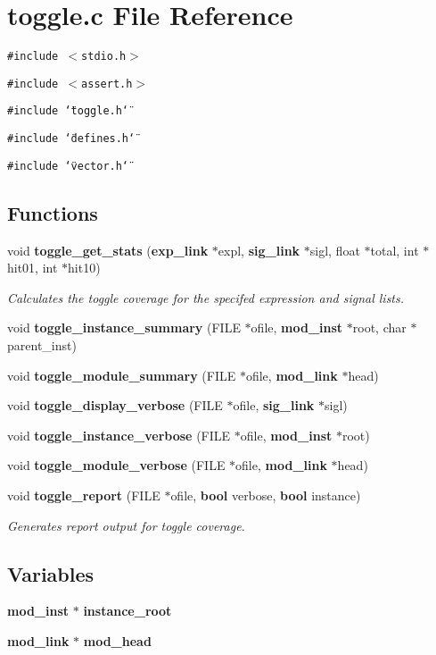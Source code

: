 \section{toggle.c File Reference}
\label{toggle_8c}
{\tt \#include $<$stdio.h$>$}\par
{\tt \#include $<$assert.h$>$}\par
{\tt \#include \char`\"{}toggle.h\char`\"{}}\par
{\tt \#include \char`\"{}defines.h\char`\"{}}\par
{\tt \#include \char`\"{}vector.h\char`\"{}}\par
\subsection*{Functions}
\begin{CompactItemize}
\item 
void {\bf toggle\_\-get\_\-stats} ({\bf exp\_\-link} $\ast$expl, {\bf sig\_\-link} $\ast$sigl, float $\ast$total, int $\ast$hit01, int $\ast$hit10)
\begin{CompactList}\small\item\em Calculates the toggle coverage for the specifed expression and signal lists.\item\end{CompactList}\item 
void {\bf toggle\_\-instance\_\-summary} (FILE $\ast$ofile, {\bf mod\_\-inst} $\ast$root, char $\ast$parent\_\-inst)
\item 
void {\bf toggle\_\-module\_\-summary} (FILE $\ast$ofile, {\bf mod\_\-link} $\ast$head)
\item 
void {\bf toggle\_\-display\_\-verbose} (FILE $\ast$ofile, {\bf sig\_\-link} $\ast$sigl)
\item 
void {\bf toggle\_\-instance\_\-verbose} (FILE $\ast$ofile, {\bf mod\_\-inst} $\ast$root)
\item 
void {\bf toggle\_\-module\_\-verbose} (FILE $\ast$ofile, {\bf mod\_\-link} $\ast$head)
\item 
void {\bf toggle\_\-report} (FILE $\ast$ofile, {\bf bool} verbose, {\bf bool} instance)
\begin{CompactList}\small\item\em Generates report output for toggle coverage.\item\end{CompactList}\end{CompactItemize}
\subsection*{Variables}
\begin{CompactItemize}
\item 
{\bf mod\_\-inst} $\ast$ {\bf instance\_\-root}
\item 
{\bf mod\_\-link} $\ast$ {\bf mod\_\-head}
\end{CompactItemize}


